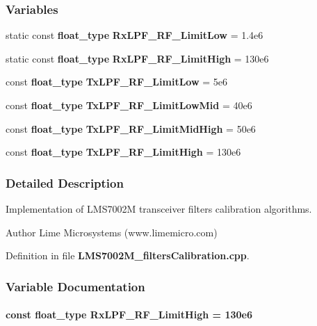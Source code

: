 \subsubsection*{Variables}
\begin{DoxyCompactItemize}
\item 
static const {\bf float\+\_\+type} {\bf Rx\+L\+P\+F\+\_\+\+R\+F\+\_\+\+Limit\+Low} = 1.\+4e6
\item 
static const {\bf float\+\_\+type} {\bf Rx\+L\+P\+F\+\_\+\+R\+F\+\_\+\+Limit\+High} = 130e6
\item 
const {\bf float\+\_\+type} {\bf Tx\+L\+P\+F\+\_\+\+R\+F\+\_\+\+Limit\+Low} = 5e6
\item 
const {\bf float\+\_\+type} {\bf Tx\+L\+P\+F\+\_\+\+R\+F\+\_\+\+Limit\+Low\+Mid} = 40e6
\item 
const {\bf float\+\_\+type} {\bf Tx\+L\+P\+F\+\_\+\+R\+F\+\_\+\+Limit\+Mid\+High} = 50e6
\item 
const {\bf float\+\_\+type} {\bf Tx\+L\+P\+F\+\_\+\+R\+F\+\_\+\+Limit\+High} = 130e6
\end{DoxyCompactItemize}


\subsubsection{Detailed Description}
Implementation of L\+M\+S7002M transceiver filters calibration algorithms. 

\begin{DoxyAuthor}{Author}
Lime Microsystems (www.\+limemicro.\+com) 
\end{DoxyAuthor}


Definition in file {\bf L\+M\+S7002\+M\+\_\+filters\+Calibration.\+cpp}.



\subsubsection{Variable Documentation}
\paragraph[{Rx\+L\+P\+F\+\_\+\+R\+F\+\_\+\+Limit\+High}]{\setlength{\rightskip}{0pt plus 5cm}const {\bf float\+\_\+type} Rx\+L\+P\+F\+\_\+\+R\+F\+\_\+\+Limit\+High = 130e6\hspace{0.3cm}{\ttfamily [static]}}\label{LMS7002M__filtersCalibration_8cpp_a05c91ce39e2a5164631243875e3dd63c}


